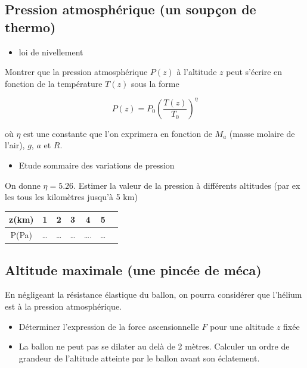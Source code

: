 \documentclass[letterpaper]{article}
\begin{document}
\subsection{Pression atmosphérique (un soupçon de thermo)}
\label{sec:org9432046}

\begin{itemize}
\item loi de nivellement
\end{itemize}
Montrer que la pression atmosphérique \(P(z)\) à l’altitude \(z\) peut s’écrire en fonction de la température \(T(z)\) sous la forme 


$$ P(z) = P_0 \left( \frac{T(z)}{T_0} \right)^{\eta} $$

où \(\eta\)  est une constante que l’on exprimera en fonction de \(M_a\) (masse molaire de l’air), \(g\), \(a\) et \(R\).


\begin{itemize}
\item Etude sommaire des variations de pression
\end{itemize}

On donne \(\eta=5.26\). Estimer la valeur de la pression à différents altitudes (par ex les tous les kilomètres jusqu'à 5 km)

\begin{table}[htbp]
\label{pression}
\centering
\begin{tabular}{|c|c|c|c|c|c|c|}
z(km) & 1 & 2 & 3 & 4 & 5\\
\hline
P(Pa) & \ldots{} & \ldots{} & \ldots{} & \ldots{}. & \ldots{}\\
\end{tabular}
\end{table}


\subsection{Altitude maximale (une pincée de méca)}
\label{sec:orge7c0935}

En négligeant la résistance élastique du ballon, on pourra considérer que l’hélium est
à la pression atmosphérique.


\begin{itemize}
\item Déterminer l'expression de la force ascensionnelle \(F\) pour une altitude \(z\) fixée
\item La ballon ne peut pas se dilater au delà de 2 mètres. Calculer un ordre de grandeur de l'altitude atteinte par le ballon avant son éclatement.
\end{itemize}
\end{document}
